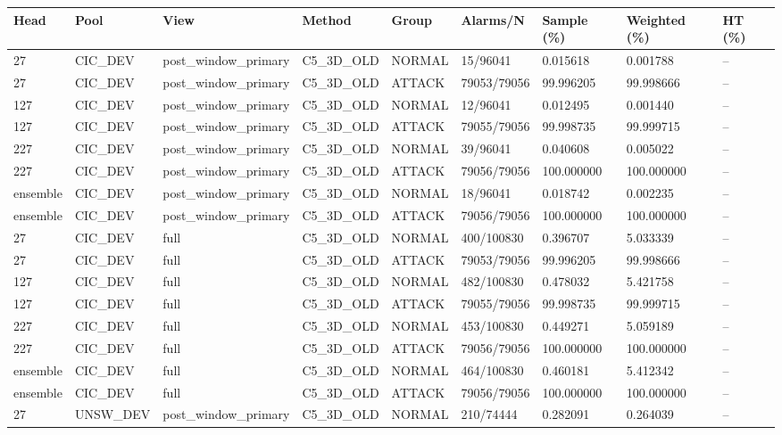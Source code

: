 \begin{tabular}{lllllllll}
\hline
Head & Pool & View & Method & Group & Alarms/N & Sample (\%) & Weighted (\%) & HT (\%) \\
\hline
27 & CIC\_DEV & post\_window\_primary & C5\_3D\_OLD & NORMAL & 15/96041 & 0.015618 & 0.001788 & -- \\
27 & CIC\_DEV & post\_window\_primary & C5\_3D\_OLD & ATTACK & 79053/79056 & 99.996205 & 99.998666 & -- \\
127 & CIC\_DEV & post\_window\_primary & C5\_3D\_OLD & NORMAL & 12/96041 & 0.012495 & 0.001440 & -- \\
127 & CIC\_DEV & post\_window\_primary & C5\_3D\_OLD & ATTACK & 79055/79056 & 99.998735 & 99.999715 & -- \\
227 & CIC\_DEV & post\_window\_primary & C5\_3D\_OLD & NORMAL & 39/96041 & 0.040608 & 0.005022 & -- \\
227 & CIC\_DEV & post\_window\_primary & C5\_3D\_OLD & ATTACK & 79056/79056 & 100.000000 & 100.000000 & -- \\
ensemble & CIC\_DEV & post\_window\_primary & C5\_3D\_OLD & NORMAL & 18/96041 & 0.018742 & 0.002235 & -- \\
ensemble & CIC\_DEV & post\_window\_primary & C5\_3D\_OLD & ATTACK & 79056/79056 & 100.000000 & 100.000000 & -- \\
27 & CIC\_DEV & full & C5\_3D\_OLD & NORMAL & 400/100830 & 0.396707 & 5.033339 & -- \\
27 & CIC\_DEV & full & C5\_3D\_OLD & ATTACK & 79053/79056 & 99.996205 & 99.998666 & -- \\
127 & CIC\_DEV & full & C5\_3D\_OLD & NORMAL & 482/100830 & 0.478032 & 5.421758 & -- \\
127 & CIC\_DEV & full & C5\_3D\_OLD & ATTACK & 79055/79056 & 99.998735 & 99.999715 & -- \\
227 & CIC\_DEV & full & C5\_3D\_OLD & NORMAL & 453/100830 & 0.449271 & 5.059189 & -- \\
227 & CIC\_DEV & full & C5\_3D\_OLD & ATTACK & 79056/79056 & 100.000000 & 100.000000 & -- \\
ensemble & CIC\_DEV & full & C5\_3D\_OLD & NORMAL & 464/100830 & 0.460181 & 5.412342 & -- \\
ensemble & CIC\_DEV & full & C5\_3D\_OLD & ATTACK & 79056/79056 & 100.000000 & 100.000000 & -- \\
27 & UNSW\_DEV & post\_window\_primary & C5\_3D\_OLD & NORMAL & 210/74444 & 0.282091 & 0.264039 & -- \\

\end{tabular}
